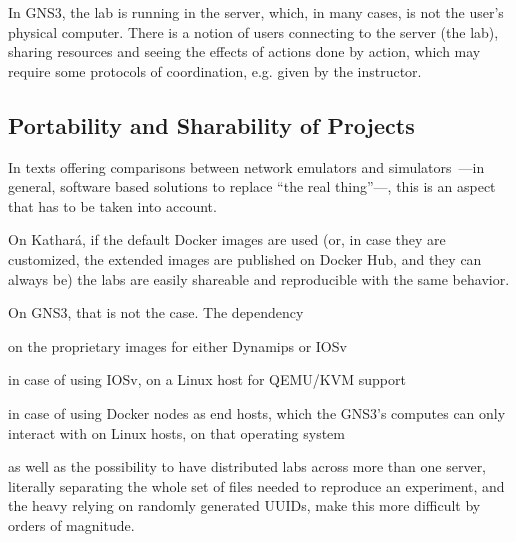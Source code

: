 In GNS3, the lab is running in the server, which, in many cases, is not the user's physical computer.
There is a notion of users connecting to the server (the lab), sharing resources and seeing the effects of actions done by action, which may require some protocols of coordination, e.g. given by the instructor.

\subsection{Portability and Sharability of Projects}
\label{subsec:comparativeportability}
In texts offering comparisons between network emulators and simulators~\cite{netkit-full,reproduciblenetexp}---in general, software based solutions to replace ``the real thing''---, this is an aspect that has to be taken into account.

On Kathará, if the default Docker images are used (or, in case they are customized, the extended images are published on Docker Hub, and they can always be) the labs are easily shareable and reproducible with the same behavior.

On GNS3, that is not the case.
The dependency
  \begin{enumerate*}[label=(\roman*), itemjoin={{, }}, itemjoin*={{, and }}]
  \item on the proprietary images for either Dynamips or IOSv
  \item in case of using IOSv, on a Linux host for QEMU/KVM support
  \item in case of using Docker nodes as end hosts, which the GNS3's computes can only interact with on Linux hosts, on that operating system
  \end{enumerate*}
as well as the possibility to have distributed labs across more than one server, literally separating the whole set of files needed to reproduce an experiment, and the heavy relying on randomly generated UUIDs, make this more difficult by orders of magnitude. %

